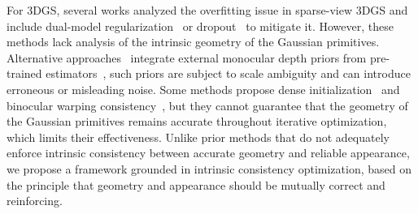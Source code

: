 For 3DGS, several works analyzed the overfitting issue in sparse-view 3DGS and include dual-model regularization~\cite{zhang2024cor} or dropout~\cite{park2025dropgaussian,xu2025dropoutgs,chen2025quantifying} to mitigate it. 
However, these methods lack analysis of the intrinsic geometry of the Gaussian primitives.
Alternative approaches~\cite{zhu2024fsgs,li2024dngaussian,xiong2023sparsegs, paliwal2024coherentgs, chung2024depth} integrate external monocular depth priors from pre-trained estimators~\cite{ranftl2021vision, cao2022mvsformer}, such priors are subject to scale ambiguity and can introduce erroneous or misleading noise. 
Some methods propose dense initialization~\cite{zheng2025nexusgs} and binocular warping consistency~\cite{han2024binocular}, but they cannot guarantee that the geometry of the Gaussian primitives remains accurate throughout iterative optimization, which limits their effectiveness.
Unlike prior methods that do not adequately enforce intrinsic consistency between 
accurate geometry and reliable appearance, we propose a framework grounded in 
intrinsic consistency optimization, based on the principle that geometry and 
appearance should be mutually correct and reinforcing.